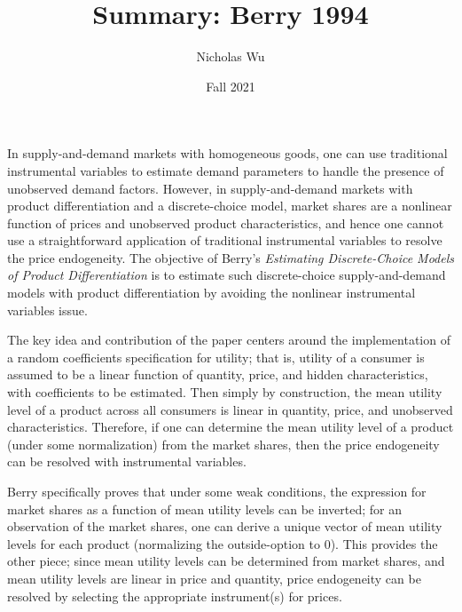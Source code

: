 \documentclass{article}
\begin{document}


\title{Summary: Berry 1994}

\author{Nicholas Wu}

\date{Fall 2021}

\maketitle

In supply-and-demand markets with homogeneous goods, one can use traditional instrumental variables to estimate demand parameters to handle the presence of unobserved demand factors. However, in supply-and-demand markets with product differentiation and a discrete-choice model, market shares are a nonlinear function of prices and unobserved product characteristics, and hence one cannot use a straightforward application of traditional instrumental variables to resolve the price endogeneity. The objective of Berry's \textit{Estimating Discrete-Choice Models of Product Differentiation} is to estimate such discrete-choice supply-and-demand models with product differentiation by avoiding the nonlinear instrumental variables issue.

The key idea and contribution of the paper centers around the implementation of a random coefficients specification for utility; that is, utility of a consumer is assumed to be a linear function of quantity, price, and hidden characteristics, with coefficients to be estimated. Then simply by construction, the mean utility level of a product across all consumers is linear in quantity, price, and unobserved characteristics. Therefore, if one can determine the mean utility level of a product (under some normalization) from the market shares, then the price endogeneity can be resolved with instrumental variables.

Berry specifically proves that under some weak conditions, the expression for market shares as a function of mean utility levels can be inverted; for an observation of the market shares, one can derive a unique vector of mean utility levels for each product (normalizing the outside-option to 0). This provides the other piece; since mean utility levels can be determined from market shares, and mean utility levels are linear in price and quantity, price endogeneity can be resolved by selecting the appropriate instrument(s) for prices.
\end{document}
